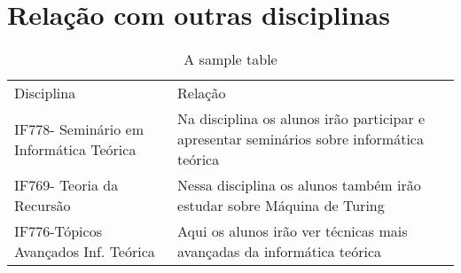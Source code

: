 \documentclass[a4paper,10pt]{extarticle}
\begin{document}
\section{Relação com outras disciplinas}
\begin{table}[h]
 \centering
 {\renewcommand\arraystretch{1.25}
 \caption{A sample table}
 \begin{tabular}{ l l }
  \cline{1-1}\cline{2-2}  
    \multicolumn{1}{|p{3.850cm}|}{Disciplina \centering } &
    \multicolumn{1}{p{4.217cm}|}{Relação \centering }
  \\  
  \cline{1-1}\cline{2-2}  
    \multicolumn{1}{|p{3.850cm}|}{IF778- Seminário em Informática Teórica} &
    \multicolumn{1}{p{4.217cm}|}{Na disciplina os alunos irão participar e apresentar seminários sobre informática teórica }
  \\  
  \cline{1-1}\cline{2-2}  
    \multicolumn{1}{|p{3.850cm}|}{IF769- Teoria da Recursão} &
    \multicolumn{1}{p{4.217cm}|}{  Nessa disciplina os alunos também irão estudar sobre Máquina de Turing}
  \\ 
  \cline{1-1}\cline{2-2}  
    \multicolumn{1}{|p{3.850cm}|}{IF776-Tópicos Avançados Inf. Teórica} &
    \multicolumn{1}{p{4.217cm}|}{ Aqui os alunos irão ver técnicas mais avançadas da informática teórica}
  \\ 
  \hline

 \end{tabular} }
\end{table}




\end{document}
